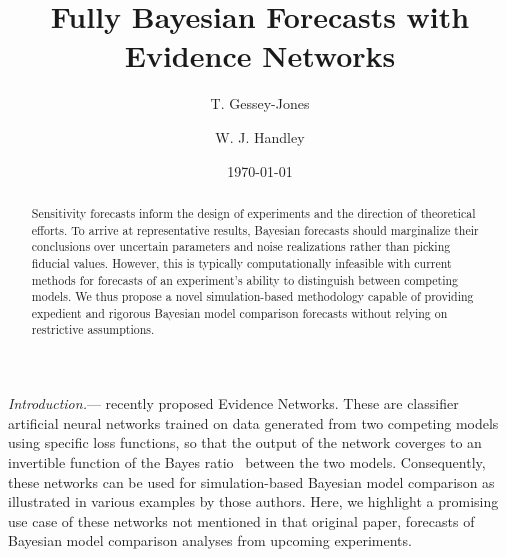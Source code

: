 \documentclass[twocolumn,english,aps,prd,amsmath,amssymb,reprint,floatfix,nofootinbib,showkeys]{revtex4-2}
\newif\ifhighlightchanges
\newcommand{\change}[1]{{\ifhighlightchanges\color{red} #1\else #1\fi}}
\begin{document}

\title{Fully Bayesian Forecasts with Evidence Networks}

\author{T. Gessey-Jones}
    
\author{W. J. Handley}
    

\date{\today}%






\begin{abstract}
Sensitivity forecasts inform the design of experiments and the direction of theoretical efforts. 
\change{To} arrive at representative results\change{,} Bayesian forecasts should marginalize their conclusions over uncertain parameters and noise realizations rather than picking fiducial values. 
However, this is \change{typically} computationally infeasible with current methods \change{for forecasts of an experiment's ability to distinguish between competing models}. 
We thus propose a novel simulation-based methodology \change{capable} of providing expedient \change{and} rigorous \change{Bayesian model comparison} forecasts without relying on restrictive assumptions.
\end{abstract}

\maketitle

\textit{Introduction.}---
\change{
\citet{EN} recently proposed Evidence Networks.
These are classifier artificial neural networks trained on data generated from two competing models using specific loss functions, so that the output of the network coverges to an invertible function of the Bayes ratio~\citep{Mackay_2003} between the two models. 
Consequently, these networks can be used for simulation-based Bayesian model comparison as illustrated in various examples by those authors. 
Here, we highlight a promising use case of these networks not mentioned in that original paper, forecasts of Bayesian model comparison analyses from upcoming experiments.  
}
\end{document}
